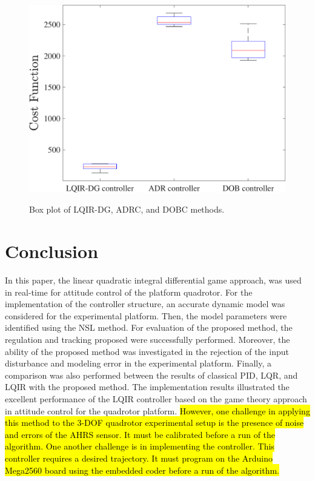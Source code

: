 \documentclass[3p]{elsarticle}
\begin{document}
\begin{figure}[H]
    \centering
    {\includegraphics[width=.55\linewidth]{../Figure/implementation/box_plot/lqidgvsboxplot_ADR}
    }
    \caption{Box plot of LQIR-DG, ADRC, and DOBC methods.}
    \label{fig:compare_boxplot_ADR}
\end{figure}


\newpage

\section{Conclusion}\label{sec:conclusion}
\vspace{-0.15cm}
\noindent In this paper, the linear quadratic integral differential game approach, was used in real-time for attitude control of the platform quadrotor. %
For the implementation of the controller structure, an accurate dynamic model was considered for the experimental platform.
Then, the model parameters were identified using the NSL method.
For evaluation of the proposed method, the regulation and tracking proposed were successfully performed.
Moreover, the ability of the proposed method was investigated in the rejection of the input disturbance and modeling error in the experimental platform.
Finally, a comparison
was also performed between the results of classical PID, LQR, and LQIR with the proposed method.
The implementation results illustrated the excellent performance of the LQIR controller based on the game theory approach in attitude control for the quadrotor platform. \hl{However, one challenge in applying this method to the 3-DOF quadrotor experimental setup is the presence of noise and errors of the AHRS sensor. It must be calibrated before a run of the algorithm. One another challenge is in implementing the controller. This controller requires a desired trajectory. It must program on the Arduino Mega2560 board using the embedded coder before a run of the algorithm.}


\end{document}
